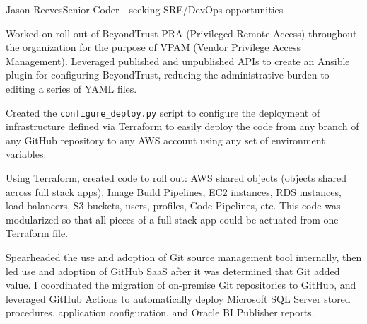 \documentclass{article}
\begin{document}
\begin{cv}[avatar]{Jason Reeves}{Senior Coder - seeking SRE/DevOps opportunities}
\begin{cvevent}[2022-2023]
    Worked on roll out of BeyondTrust PRA (Privileged Remote Access) throughout the organization for the purpose of VPAM (Vendor Privilege Access Management).  Leveraged published and unpublished APIs to create an Ansible plugin for configuring BeyondTrust, reducing the administrative burden to editing a series of YAML files.  
    \vspace*{5mm}
\end{cvevent}

\begin{cvevent}[2020-2021]
    Created the \texttt{configure\_deploy.py} script to configure the deployment of infrastructure defined via Terraform to easily deploy the code from any branch of any GitHub repository to any AWS account using any set of environment variables.
    \vspace*{5mm}
\end{cvevent}

\begin{cvevent}[2020-2021]
    Using Terraform, created code to roll out: AWS shared objects (objects shared across full stack apps), Image Build Pipelines, EC2 instances, RDS instances, load balancers, S3 buckets, users, profiles, Code Pipelines, etc.  This code was modularized so that all pieces of a full stack app could be actuated from one Terraform file.
    \vspace*{5mm}
\end{cvevent}

\begin{cvevent}[2019-2020]
    Spearheaded the use and adoption of Git source management tool internally, then led use and adoption of GitHub SaaS after it was determined that Git added value.  I coordinated the migration of on-premise Git repositories to GitHub, and leveraged GitHub Actions to automatically deploy Microsoft SQL Server stored procedures, application configuration, and Oracle BI Publisher reports.
    \vspace*{5mm}
\end{cvevent}


\end{cv}
\end{document}
